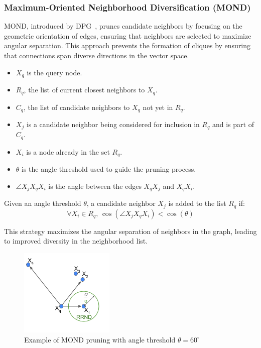 \subsubsection{Maximum-Oriented Neighborhood Diversification (MOND)}
MOND, introduced by DPG~\cite{dpg}, prunes candidate neighbors by focusing on the geometric orientation of edges, ensuring that neighbors are selected to maximize angular separation. This approach prevents the formation of cliques by ensuring that connections span diverse directions in the vector space.

\begin{itemize}
    \item \(X_q\) is the query node.
    \item \(R_q\), the list of current closest neighbors to \(X_q\).
    \item \(C_q\), the list of candidate neighbors to \(X_q\) not yet in \(R_q\).
    \item \(X_j\) is a candidate neighbor being considered for inclusion in \(R_q\) and is part of \(C_q\).
    \item \(X_i\) is a node already in the set \(R_q\).
    \item \(\theta\) is the angle threshold used to guide the pruning process.
    \item \(\angle X_j X_q X_i\) is the angle between the edges \(X_qX_j\) and \(X_qX_i\).
\end{itemize}

\begin{definition}
\label{def:mond}
Given an angle threshold \(\theta\), a candidate neighbor \(X_j\) is added to the list \(R_q\) if:
\begin{equation}
    \forall X_i \in R_q, \, \cos(\angle X_j X_q X_i) < \cos(\theta)
\end{equation}
\end{definition}

This strategy maximizes the angular separation of neighbors in the graph, leading to improved diversity in the neighborhood list.

\begin{figure}[h]
    \centering
    \includegraphics[width=0.4\textwidth]{../img/related/rrnd.png}
    \caption{Example of MOND pruning with angle threshold \(\theta = 60^\circ\)}
    \label{fig:ND:MOND}
\end{figure}

